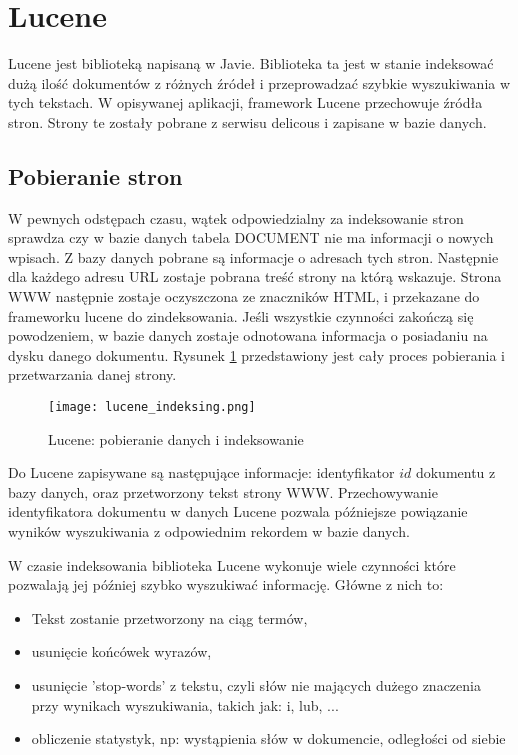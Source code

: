 \section{Lucene}


Lucene jest biblioteką napisaną w Javie. Biblioteka ta jest w stanie indeksować dużą ilość dokumentów z różnych źródeł i przeprowadzać szybkie wyszukiwania w tych tekstach. W opisywanej aplikacji, framework Lucene przechowuje źródła stron. Strony te zostały pobrane z  serwisu delicous i zapisane w bazie danych. 

\subsection{Pobieranie stron}

W pewnych odstępach czasu, wątek odpowiedzialny za indeksowanie stron sprawdza czy w bazie danych tabela DOCUMENT nie ma informacji o nowych wpisach. Z bazy danych pobrane są informacje o adresach tych stron. Następnie dla każdego adresu URL zostaje pobrana treść strony na którą wskazuje. Strona WWW następnie zostaje oczyszczona ze znaczników HTML, i przekazane do frameworku lucene do zindeksowania. Jeśli wszystkie czynności zakończą się powodzeniem, w bazie danych zostaje odnotowana informacja o posiadaniu na dysku danego dokumentu. Rysunek \ref{fig:lucene_index_fig} przedstawiony jest cały proces pobierania i przetwarzania danej strony.

\begin{figure}[htb]

\texttt{[image: lucene\_indeksing.png]}
\caption{Lucene: pobieranie danych i indeksowanie}
\label{fig:lucene_index_fig}
\end{figure}

Do Lucene zapisywane są następujące informacje: identyfikator $id$ dokumentu z bazy danych, oraz przetworzony tekst strony WWW. Przechowywanie identyfikatora dokumentu w danych Lucene pozwala późniejsze powiązanie wyników wyszukiwania z odpowiednim rekordem w bazie danych. 

W czasie indeksowania biblioteka Lucene wykonuje wiele czynności które pozwalają jej później szybko wyszukiwać informację. Główne z nich to:
\begin{itemize}
\item Tekst zostanie przetworzony na ciąg termów,
\item usunięcie końcówek wyrazów,
\item usunięcie 'stop-words' z tekstu, czyli słów nie mających dużego znaczenia przy wynikach wyszukiwania, takich jak: i, lub, ...
\item obliczenie statystyk, np: wystąpienia słów w dokumencie, odległości od siebie
\end{itemize}


